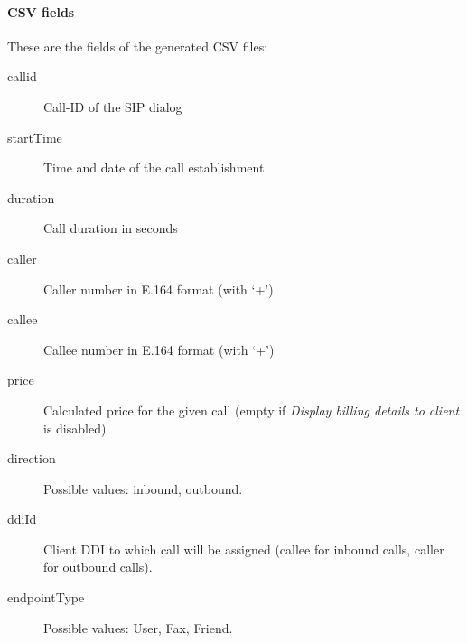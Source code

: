 \documentclass[letterpaper,10pt,spanish]{sphinxmanual}
\begin{document}
\paragraph{CSV fields}
\label{administration_portal/client/vpbx/calls/call_csv_schedulers:csv-fields}
These are the fields of the generated CSV files:
\begin{description}
\item[{callid}] \leavevmode{}\label{administration_portal/client/vpbx/calls/call_csv_schedulers:term-callid}
Call-ID of the SIP dialog

\item[{startTime}] \leavevmode{}\label{administration_portal/client/vpbx/calls/call_csv_schedulers:term-starttime}
Time and date of the call establishment

\item[{duration}] \leavevmode{}\label{administration_portal/client/vpbx/calls/call_csv_schedulers:term-duration}
Call duration in seconds

\item[{caller}] \leavevmode{}\label{administration_portal/client/vpbx/calls/call_csv_schedulers:term-caller}
Caller number in E.164 format (with `+')

\item[{callee}] \leavevmode{}\label{administration_portal/client/vpbx/calls/call_csv_schedulers:term-callee}
Callee number in E.164 format (with `+')

\item[{price}] \leavevmode{}\label{administration_portal/client/vpbx/calls/call_csv_schedulers:term-price}
Calculated price for the given call (empty if \emph{Display billing details to client} is disabled)

\item[{direction}] \leavevmode{}\label{administration_portal/client/vpbx/calls/call_csv_schedulers:term-17}
Possible values: inbound, outbound.

\item[{ddiId}] \leavevmode{}\label{administration_portal/client/vpbx/calls/call_csv_schedulers:term-ddiid}
Client DDI to which call will be assigned (callee for inbound calls, caller for outbound calls).

\item[{endpointType}] \leavevmode{}\label{administration_portal/client/vpbx/calls/call_csv_schedulers:term-endpointtype}
Possible values: User, Fax, Friend.


\end{description}
\end{document}
